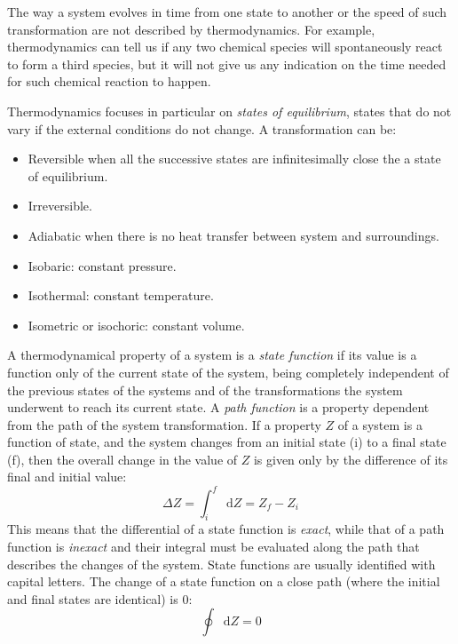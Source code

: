 \documentclass[12pt,a4paper]{report}
\newcommand*\diff{\mathop{}\!\mathrm{d}}
\begin{document}
   The way a system evolves in time from one state to another or the speed of such transformation are not described by thermodynamics. For example, thermodynamics can tell us if any two chemical species will spontaneously react to form a third species, but it will not give us any indication on the time needed for such chemical reaction to happen.
   
   Thermodynamics focuses in particular on \textit{states of equilibrium}, states that do not vary if the external conditions do not change.
   A transformation can be:
   \begin{itemize}
   \item Reversible when all the successive states are infinitesimally close the a state of equilibrium.
   \item Irreversible. 
   \item Adiabatic when there is no heat transfer between system and surroundings.
   \item Isobaric: constant pressure.
   \item Isothermal: constant temperature.
   \item Isometric or isochoric: constant volume.
   \end{itemize}

   A thermodynamical property of a system is a \textit{state function} if its value is a function only of the current state of the system, being completely independent of the previous states of the systems and of the transformations the system underwent to reach its current state. A \textit{path function} is a property dependent from the path of the system transformation.
   If a property $Z$ of a system is a function of state, and the system changes from an initial state (i) to a final state (f), then the overall change in the value of $Z$ is given only by the difference of its final and initial value: 
   \begin{equation*}
   \Delta Z = \int_{i}^{f}\diff Z = Z_{f}-Z_{i}
   \end{equation*}
This means that the differential of a state function is \textit{exact}, while that of a path function is \textit{inexact} and their integral must be evaluated along the path that describes the changes of the system. State functions are usually identified with capital letters.
The change of a state function on a close path (where the initial and final states are identical) is 0:
   \begin{equation*}
   \oint\diff Z = 0
   \end{equation*}
\end{document}

